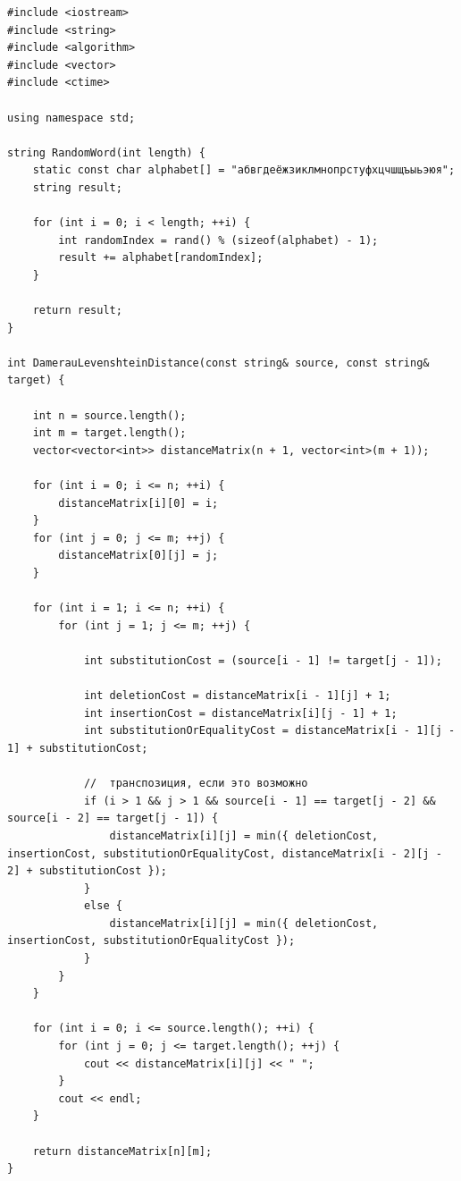 \documentclass[12pt, a4paper]{article}
\begin{document}
\begin{lstlisting}[caption={Расстояние Дамерау-Левенштейна нерекурсивный метод, используя матрицу},label={lst:label2}]
#include <iostream>
#include <string>
#include <algorithm>
#include <vector>
#include <ctime>

using namespace std;

string RandomWord(int length) {
	static const char alphabet[] = "абвгдеёжзиклмнопрстуфхцчшщъыьэюя";
	string result;

	for (int i = 0; i < length; ++i) {
		int randomIndex = rand() % (sizeof(alphabet) - 1);
		result += alphabet[randomIndex];
	}

	return result;
}

int DamerauLevenshteinDistance(const string& source, const string& target) {

	int n = source.length();
	int m = target.length();
	vector<vector<int>> distanceMatrix(n + 1, vector<int>(m + 1));

	for (int i = 0; i <= n; ++i) {
		distanceMatrix[i][0] = i;
	}
	for (int j = 0; j <= m; ++j) {
		distanceMatrix[0][j] = j;
	}

	for (int i = 1; i <= n; ++i) {
		for (int j = 1; j <= m; ++j) {

			int substitutionCost = (source[i - 1] != target[j - 1]);

			int deletionCost = distanceMatrix[i - 1][j] + 1;
			int insertionCost = distanceMatrix[i][j - 1] + 1;
			int substitutionOrEqualityCost = distanceMatrix[i - 1][j - 1] + substitutionCost;

			//  транспозиция, если это возможно
			if (i > 1 && j > 1 && source[i - 1] == target[j - 2] && source[i - 2] == target[j - 1]) {
				distanceMatrix[i][j] = min({ deletionCost, insertionCost, substitutionOrEqualityCost, distanceMatrix[i - 2][j - 2] + substitutionCost });
			}
			else {
				distanceMatrix[i][j] = min({ deletionCost, insertionCost, substitutionOrEqualityCost });
			}
		}
	}

	for (int i = 0; i <= source.length(); ++i) {
		for (int j = 0; j <= target.length(); ++j) {
			cout << distanceMatrix[i][j] << " ";
		}
		cout << endl;
	}

	return distanceMatrix[n][m];
}


\end{lstlisting}
\end{document}

